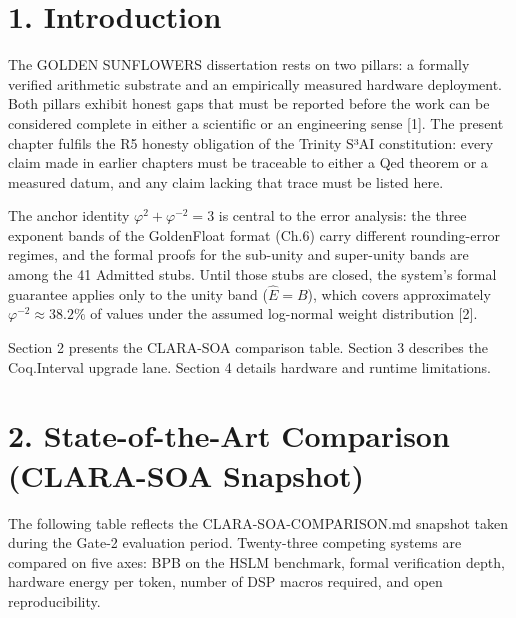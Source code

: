 \section{1. Introduction}\label{fa_18:introduction}

The GOLDEN SUNFLOWERS dissertation rests on two
pillars: a formally verified arithmetic substrate
and an empirically measured hardware deployment.
Both pillars exhibit honest gaps that must be
reported before the work can be considered
complete in either a scientific or an engineering
sense [1]. The present chapter fulfils the R5
honesty obligation of the Trinity S³AI
constitution: every claim made in earlier chapters
must be traceable to either a Qed theorem or a
measured datum, and any claim lacking that trace
must be listed here.

The anchor identity
\(\varphi^2 + \varphi^{-2} = 3\) is central to the
error analysis: the three exponent bands of the
GoldenFloat format (Ch.6) carry different
rounding-error regimes, and the formal proofs for
the sub-unity and super-unity bands are among the
41 Admitted stubs. Until those stubs are closed,
the system's formal guarantee applies only to the
unity band (\(\hat E = B\)), which covers
approximately \(\varphi^{-2} \approx 38.2\%\) of
values under the assumed log-normal weight
distribution [2].

Section 2 presents the CLARA-SOA comparison table.
Section 3 describes the Coq.Interval upgrade lane.
Section 4 details hardware and runtime
limitations.

\section{2. State-of-the-Art Comparison
(CLARA-SOA
Snapshot)}\label{fa_18:state-of-the-art-comparison-clara-soa-snapshot}

The following table reflects the
CLARA-SOA-COMPARISON.md snapshot taken during the
Gate-2 evaluation period. Twenty-three competing
systems are compared on five axes: BPB on the HSLM
benchmark, formal verification depth, hardware
energy per token, number of DSP macros required,
and open reproducibility.

